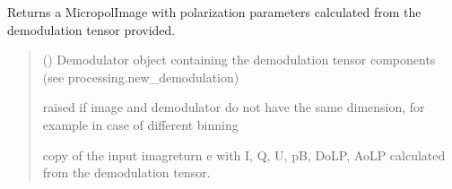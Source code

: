 \documentclass[letterpaper,10pt,english]{sphinxmanual}
\begin{document}
\begin{fulllineitems}
\begin{fulllineitems}
\begin{quote}
\begin{description}
\sphinxAtStartPar
{\hyperref[\detokenize{micropolarray:micropolarray.micropol_image.MicropolImage}]{}}

\end{description}\end{quote}

\end{fulllineitems}


\begin{fulllineitems}
\label{\detokenize{micropolarray:micropolarray.micropol_image.MicropolImage.demodulate}}
\pysigstartsignatures
{}
\pysigstopsignatures
\sphinxAtStartPar
Returns a MicropolImage with polarization parameters calculated from the demodulation tensor provided.
\begin{quote}\begin{description}
\sphinxAtStartPar
{} ({\hyperref[\detokenize{micropolarray.processing:micropolarray.processing.demodulation.Demodulator}]{}}) \textendash{} Demodulator object containing the demodulation tensor components (see processing.new\_demodulation)

\sphinxAtStartPar
{} \textendash{} raised if image and demodulator do not have the same dimension, for example in case of different binning

\sphinxAtStartPar
copy of the input imagreturn e with I, Q, U, pB, DoLP, AoLP calculated from the demodulation tensor.

\sphinxAtStartPar
{\hyperref[\detokenize{micropolarray:micropolarray.micropol_image.MicropolImage}]{}}

\end{description}\end{quote}


\end{fulllineitems}
\end{fulllineitems}
\end{document}
